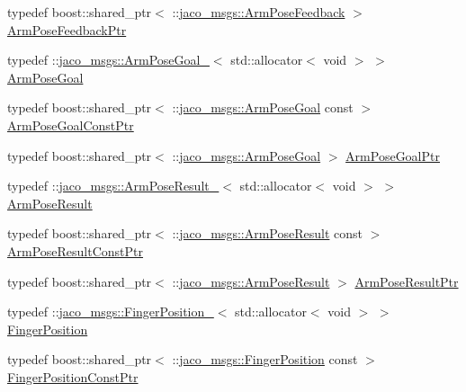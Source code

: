 \begin{DoxyCompactItemize}
\item 
typedef boost\+::shared\+\_\+ptr$<$ \+::\hyperlink{namespacejaco__msgs_a0157e0f10c971ac0b7a8f5c9ce836574}{jaco\+\_\+msgs\+::\+Arm\+Pose\+Feedback} $>$ \hyperlink{namespacejaco__msgs_a931f0a0167ab47b32cb38d4f9a9d1233}{Arm\+Pose\+Feedback\+Ptr}
\item 
typedef \+::\hyperlink{structjaco__msgs_1_1ArmPoseGoal__}{jaco\+\_\+msgs\+::\+Arm\+Pose\+Goal\+\_\+}$<$ std\+::allocator$<$ void $>$ $>$ \hyperlink{namespacejaco__msgs_a5ff16ec456eb5f8fa3902e12a781919f}{Arm\+Pose\+Goal}
\item 
typedef boost\+::shared\+\_\+ptr$<$ \+::\hyperlink{namespacejaco__msgs_a5ff16ec456eb5f8fa3902e12a781919f}{jaco\+\_\+msgs\+::\+Arm\+Pose\+Goal} const  $>$ \hyperlink{namespacejaco__msgs_ab8464776109924758c47fab6ce179567}{Arm\+Pose\+Goal\+Const\+Ptr}
\item 
typedef boost\+::shared\+\_\+ptr$<$ \+::\hyperlink{namespacejaco__msgs_a5ff16ec456eb5f8fa3902e12a781919f}{jaco\+\_\+msgs\+::\+Arm\+Pose\+Goal} $>$ \hyperlink{namespacejaco__msgs_aa7e27fa1c080cb8bb2bda37ce26d64fa}{Arm\+Pose\+Goal\+Ptr}
\item 
typedef \+::\hyperlink{structjaco__msgs_1_1ArmPoseResult__}{jaco\+\_\+msgs\+::\+Arm\+Pose\+Result\+\_\+}$<$ std\+::allocator$<$ void $>$ $>$ \hyperlink{namespacejaco__msgs_a75b02cbf5c3780ca0f73e5dc1b860dd3}{Arm\+Pose\+Result}
\item 
typedef boost\+::shared\+\_\+ptr$<$ \+::\hyperlink{namespacejaco__msgs_a75b02cbf5c3780ca0f73e5dc1b860dd3}{jaco\+\_\+msgs\+::\+Arm\+Pose\+Result} const  $>$ \hyperlink{namespacejaco__msgs_a435993a8f07ca92191026509e5f4cd42}{Arm\+Pose\+Result\+Const\+Ptr}
\item 
typedef boost\+::shared\+\_\+ptr$<$ \+::\hyperlink{namespacejaco__msgs_a75b02cbf5c3780ca0f73e5dc1b860dd3}{jaco\+\_\+msgs\+::\+Arm\+Pose\+Result} $>$ \hyperlink{namespacejaco__msgs_a8098e9c28ec21df7e002a399d23c48d1}{Arm\+Pose\+Result\+Ptr}
\item 
typedef \+::\hyperlink{structjaco__msgs_1_1FingerPosition__}{jaco\+\_\+msgs\+::\+Finger\+Position\+\_\+}$<$ std\+::allocator$<$ void $>$ $>$ \hyperlink{namespacejaco__msgs_a8d92f0e718e45f82b621ddf049a2f110}{Finger\+Position}
\item 
typedef boost\+::shared\+\_\+ptr$<$ \+::\hyperlink{namespacejaco__msgs_a8d92f0e718e45f82b621ddf049a2f110}{jaco\+\_\+msgs\+::\+Finger\+Position} const  $>$ \hyperlink{namespacejaco__msgs_acb9f03caff18d5ea850efba0ccbb807b}{Finger\+Position\+Const\+Ptr}
\item 

\end{DoxyCompactItemize}
